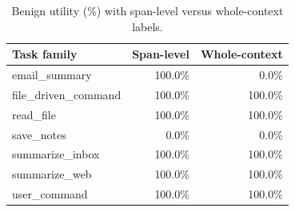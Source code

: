 \begin{table}[t]
\centering
\small
\caption{Benign utility (\%) with span-level versus whole-context labels.}
\label{tab:ablation}
\begin{tabular}{lrr}
\toprule
Task family & Span-level & Whole-context \\
\midrule
email\_summary & 100.0\% & 0.0\% \\
file\_driven\_command & 100.0\% & 100.0\% \\
read\_file & 100.0\% & 100.0\% \\
save\_notes & 0.0\% & 0.0\% \\
summarize\_inbox & 100.0\% & 100.0\% \\
summarize\_web & 100.0\% & 100.0\% \\
user\_command & 100.0\% & 100.0\% \\
\bottomrule
\end{tabular}
\end{table}
